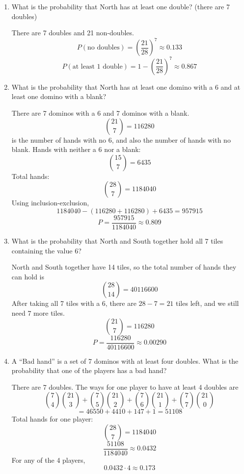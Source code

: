 \documentclass{article}
\begin{document}
\begin{enumerate}
\begin{enumerate}
        There is 1 double-six tile out of 28, and North gets 7 tiles.
        \[
        \frac{1}{28} \cdot 7 = \frac{7}{28} = \frac{1}{4} = 0.25
        \]

        \item What is the probability that North has at least one double? (there are 7 doubles)

        There are 7 doubles and 21 non-doubles.
        \[
        P(\text{no doubles}) = \left(\frac{21}{28}\right)^{7} \approx 0.133
        \]
        \[
        P(\text{at least 1 double}) = 1 - \left(\frac{21}{28}\right)^{7} \approx 0.867
        \]

        \item What is the probability that North has at least one domino with a 6 and at least one domino with a blank?

        There are 7 dominos with a 6 and 7 dominos with a blank.
        \[
        \binom{21}{7} = 116280
        \]
        is the number of hands with no 6, and also the number of hands with no blank.
        Hands with neither a 6 nor a blank:
        \[
        \binom{15}{7} = 6435
        \]
        Total hands:
        \[
        \binom{28}{7} = 1184040
        \]
        Using inclusion-exclusion,
        \[
        1184040 - (116280 + 116280) + 6435 = 957915
        \]
        \[
        P = \frac{957915}{1184040} \approx 0.809
        \]

        \item What is the probability that North and South together hold all 7 tiles containing the value 6?

        North and South together have 14 tiles, so the total number of hands they can hold is
        \[
        \binom{28}{14} = 40116600
        \]
        After taking all 7 tiles with a 6, there are $28 - 7 = 21$ tiles left, and we still need 7 more tiles.
        \[
        \binom{21}{7} = 116280
        \]
        \[
        P = \frac{116280}{40116600} \approx 0.00290
        \]

        \item A ``Bad hand'' is a set of 7 dominos with at least four doubles. What is the probability that one of the players has a bad hand?

        There are 7 doubles. The ways for one player to have at least 4 doubles are
        \[
        \binom{7}{4}\binom{21}{3} + \binom{7}{5}\binom{21}{2} + \binom{7}{6}\binom{21}{1} + \binom{7}{7}\binom{21}{0}
        \]
        \[
        = 46550 + 4410 + 147 + 1 = 51108
        \]
        Total hands for one player:
        \[
        \binom{28}{7} = 1184040
        \]
        \[
        \frac{51108}{1184040} \approx 0.0432
        \]
        For any of the 4 players,
        \[
        0.0432 \cdot 4 \approx 0.173
        \]
    \end{enumerate}


\end{enumerate}
\end{document}

